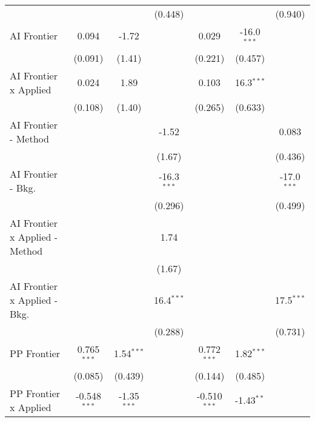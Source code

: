 \begin{tabular}{lcccccc}
                                  &                &               & (0.448)       &                &               & (0.940)\\   
   AI Frontier                    & 0.094          & -1.72         &               & 0.029          & -16.0$^{***}$ &   \\   
                                  & (0.091)        & (1.41)        &               & (0.221)        & (0.457)       &   \\   
   AI Frontier x Applied          & 0.024          & 1.89          &               & 0.103          & 16.3$^{***}$  &   \\   
                                  & (0.108)        & (1.40)        &               & (0.265)        & (0.633)       &   \\   
   AI Frontier - Method           &                &               & -1.52         &                &               & 0.083\\   
                                  &                &               & (1.67)        &                &               & (0.436)\\   
   AI Frontier - Bkg.             &                &               & -16.3$^{***}$ &                &               & -17.0$^{***}$\\   
                                  &                &               & (0.296)       &                &               & (0.499)\\   
   AI Frontier x Applied - Method &                &               & 1.74          &                &               &   \\   
                                  &                &               & (1.67)        &                &               &   \\   
   AI Frontier x Applied - Bkg.   &                &               & 16.4$^{***}$  &                &               & 17.5$^{***}$\\   
                                  &                &               & (0.288)       &                &               & (0.731)\\   
   PP Frontier                    & 0.765$^{***}$  & 1.54$^{***}$  &               & 0.772$^{***}$  & 1.82$^{***}$  &   \\   
                                  & (0.085)        & (0.439)       &               & (0.144)        & (0.485)       &   \\   
   PP Frontier x Applied          & -0.548$^{***}$ & -1.35$^{***}$ &               & -0.510$^{***}$ & -1.43$^{**}$  &   \\   

\end{tabular}
